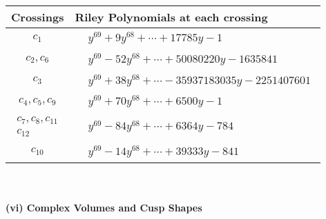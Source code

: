\documentclass[1p]{elsarticle_modified}
\theoremstyle{definition}
\begin{document}
\begin{tabular}{m{50pt}|m{274pt}}
Crossings & \hspace{64pt}Riley Polynomials at each crossing \\
\hline $$\begin{aligned}c_{1}\end{aligned}$$&$\begin{aligned}
&y^{69}+9 y^{68}+\cdots+17785 y-1
\end{aligned}$\\
\hline $$\begin{aligned}c_{2},c_{6}\end{aligned}$$&$\begin{aligned}
&y^{69}-52 y^{68}+\cdots+50080220 y-1635841
\end{aligned}$\\
\hline $$\begin{aligned}c_{3}\end{aligned}$$&$\begin{aligned}
&y^{69}+38 y^{68}+\cdots-35937183035 y-2251407601
\end{aligned}$\\
\hline $$\begin{aligned}c_{4},c_{5},c_{9}\end{aligned}$$&$\begin{aligned}
&y^{69}+70 y^{68}+\cdots+6500 y-1
\end{aligned}$\\
\hline $$\begin{aligned}c_{7},c_{8},c_{11}\\c_{12}\end{aligned}$$&$\begin{aligned}
&y^{69}-84 y^{68}+\cdots+6364 y-784
\end{aligned}$\\
\hline $$\begin{aligned}c_{10}\end{aligned}$$&$\begin{aligned}
&y^{69}-14 y^{68}+\cdots+39333 y-841
\end{aligned}$\\
\hline
\end{tabular}\\~\\
\newpage\flushleft \textbf{(vi) Complex Volumes and Cusp Shapes}
\end{document}
